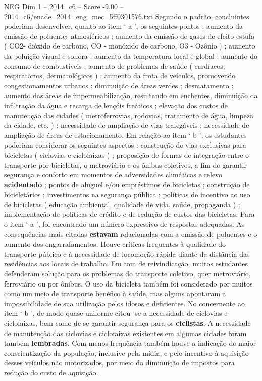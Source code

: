 \begin{textsample}{NEG Dim 1 – 2014\_c6 – Score -9.00 – 2014\_c6/enade\_2014\_eng\_mec\_5ff0301576.txt}
Segundo o padrão, concluintes poderiam desenvolver, quanto ao item ‘ a ’, os seguintes pontos : aumento da emissão de poluentes atmosféricos ; aumento da emissão de gases de efeito estufa ( CO2- dióxido de carbono, CO - monóxido de carbono, O3 - Ozônio ) ; aumento da poluição visual e sonora ; aumento da temperatura local e global ; aumento do consumo de combustíveis ; aumento de problemas de saúde ( cardíacos, respiratórios, dermatológicos ) ; aumento da frota de veículos, promovendo congestionamentos urbanos ; diminuição de áreas verdes ; desmatamento ; aumento das áreas de impermeabilização, resultando em enchentes, diminuição da infiltração da água e recarga de lençóis freáticos ; elevação dos custos de manutenção das cidades ( metroferrovias, rodovias, tratamento de água, limpeza da cidade, etc. ) ; necessidade de ampliação de vias trafegáveis ; necessidade de ampliação de áreas de estacionamento.
Em relação ao item ‘ b ’, os estudantes poderiam considerar os seguintes aspectos : construção de vias exclusivas para bicicletas ( ciclovias e ciclofaixas ) ; proposição de formas de integração entre o transporte por bicicletas, o metroviário e os ônibus coletivos, a fim de garantir segurança e conforto em momentos de adversidades climáticas e relevo \textbf{acidentado} ; pontos de aluguel e/ou empréstimos de bicicletas ; construção de bicicletários ; investimentos na segurança pública ; políticas de incentivo ao uso de bicicletas ( educação ambiental, qualidade de vida, saúde, propaganda ) ; implementação de políticas de crédito e de redução de custos das bicicletas.
Para o item ‘ a ’, foi encontrado um número expressivo de respostas adequadas.
As consequências mais citadas \textbf{estavam} relacionadas com a emissão de poluentes e o aumento dos engarrafamentos.
Houve críticas frequentes à qualidade do transporte público e à necessidade de locomoção rápida diante da distância das residências aos locais de trabalho.
Em tom de reivindicação, muitos estudantes defenderam solução para os problemas do transporte coletivo, quer metroviário, ferroviário ou por ônibus.
O uso da bicicleta também foi considerado por muitos como um meio de transporte benéfico à saúde, mas alguns apontaram a impossibilidade de sua utilização pelos idosos e deficientes.
No concernente ao item ‘ b ’, de modo quase uniforme citou -se a necessidade de ciclovias e ciclofaixas, bem como de se garantir segurança para os \textbf{ciclistas}.
A necessidade de manutenção das ciclovias e ciclofaixas existentes em algumas cidades foram também \textbf{lembradas}.
Com menos frequência também houve a indicação de maior conscientização da população, inclusive pela mídia, e pelo incentivo à aquisição desses veículos não motorizados, por meio da diminuição de impostos para redução do custo de aquisição.

\end{textsample}
